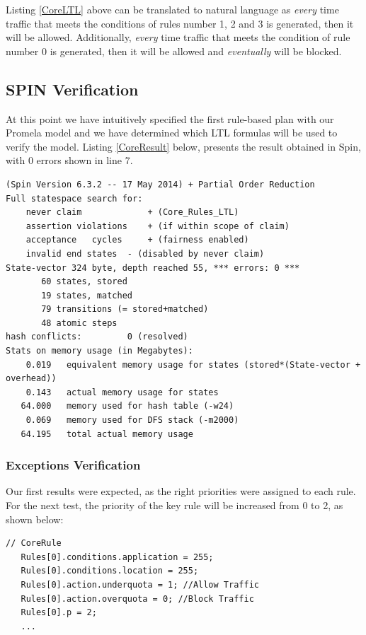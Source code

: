 Listing \ref{CoreLTL} above can be translated to natural language as \emph{every} time traffic that meets the conditions of rules number 1, 2 and 3 is generated, then it will be allowed. Additionally, \emph{every} time traffic that meets the condition of rule number 0 is generated, then it will be allowed and \emph{eventually} will be blocked.

\subsection{SPIN Verification}
\noindent 
At this point we have intuitively specified the first rule-based plan with our Promela model and we have determined which LTL formulas will be used to verify the model. Listing \ref{CoreResult} below, presents the result obtained in Spin, with 0 errors shown in line 7.

\singlespacing
\begin{lstlisting}[caption=Core-Rules Plan Verification,
  label=CoreResult]
(Spin Version 6.3.2 -- 17 May 2014) + Partial Order Reduction
Full statespace search for:
	never claim         	+ (Core_Rules_LTL)
	assertion violations	+ (if within scope of claim)
	acceptance   cycles 	+ (fairness enabled)
	invalid end states	- (disabled by never claim)
State-vector 324 byte, depth reached 55, *** errors: 0 ***
       60 states, stored
       19 states, matched
       79 transitions (= stored+matched)
       48 atomic steps
hash conflicts:         0 (resolved)
Stats on memory usage (in Megabytes):
    0.019	equivalent memory usage for states (stored*(State-vector + overhead))
    0.143	actual memory usage for states
   64.000	memory used for hash table (-w24)
    0.069	memory used for DFS stack (-m2000)
   64.195	total actual memory usage
\end{lstlisting}
\doublespacing

\subsubsection{Exceptions Verification}
\noindent Our first results were expected, as the right priorities were assigned to each rule. For the next test, the priority of the key rule will be increased from 0 to 2, as shown below:

\singlespacing
\begin{lstlisting}[caption=Increased priority of the Core Rule,
  label=CoreRules_wrong]
   // CoreRule
   Rules[0].conditions.application = 255;
   Rules[0].conditions.location = 255;
   Rules[0].action.underquota = 1; //Allow Traffic
   Rules[0].action.overquota = 0; //Block Traffic
   Rules[0].p = 2; 
   ...
\end{lstlisting}
\doublespacing \bigskip

